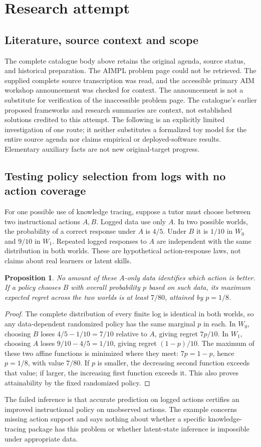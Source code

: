 \documentclass[11pt]{article}
\newtheorem{proposition}{Proposition}
\begin{document}
\section{Research attempt}
\subsection{Literature, source context and scope}
The complete catalogue body above retains the original agenda, source status, and historical preparation. The AIMPL problem page could not be retrieved. The supplied complete source transcription was read, and the accessible primary AIM workshop announcement was checked for context. The announcement is not a substitute for verification of the inaccessible problem page. The catalogue's earlier proposed frameworks and research summaries are context, not established solutions credited to this attempt. The following is an explicitly limited investigation of one route; it neither substitutes a formalized toy model for the entire source agenda nor claims empirical or deployed-software results. Elementary auxiliary facts are not new original-target progress.

\subsection{Testing policy selection from logs with no action coverage}
For one possible use of knowledge tracing, suppose a tutor must choose between two instructional actions $A,B$. Logged data use only $A$. In two possible worlds, the probability of a correct response under $A$ is $4/5$. Under $B$ it is $1/10$ in $W_0$ and $9/10$ in $W_1$. Repeated logged responses to $A$ are independent with the same distribution in both worlds. These are hypothetical action-response laws, not claims about real learners or latent skills.
\begin{proposition}
No amount of these $A$-only data identifies which action is better. If a policy chooses $B$ with overall probability $p$ based on such data, its maximum expected regret across the two worlds is at least $7/80$, attained by $p=1/8$.
\end{proposition}
\begin{proof}
The complete distribution of every finite log is identical in both worlds, so any data-dependent randomized policy has the same marginal $p$ in each. In $W_0$, choosing $B$ loses $4/5-1/10=7/10$ relative to $A$, giving regret $7p/10$. In $W_1$, choosing $A$ loses $9/10-4/5=1/10$, giving regret $(1-p)/10$. The maximum of these two affine functions is minimized where they meet: $7p=1-p$, hence $p=1/8$, with value $7/80$. If $p$ is smaller, the decreasing second function exceeds that value; if larger, the increasing first function exceeds it. This also proves attainability by the fixed randomized policy.
\end{proof}
The failed inference is that accurate prediction on logged actions certifies an improved instructional policy on unobserved actions. The example concerns missing action support and says nothing about whether a specific knowledge-tracing package has this problem or whether latent-state inference is impossible under appropriate data.
\end{document}
